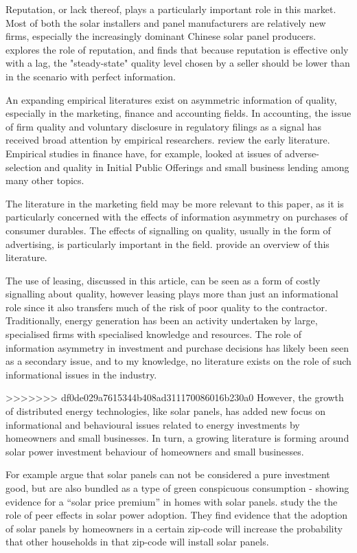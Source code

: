 \documentclass[12pt]{article}
\begin{document}
Reputation, or lack thereof, plays a particularly important role in this market. Most of both the solar installers and panel manufacturers are relatively new firms, especially the increasingly dominant Chinese solar panel producers. \citet{shapiro_consumer_1982} explores the role of reputation, and finds that because reputation is effective only with a lag, the "steady-state" quality level chosen by a seller should be lower than in the scenario with perfect information.

An expanding empirical literatures exist on asymmetric information of quality, especially in the marketing, finance and accounting fields. In accounting, the issue of firm quality and voluntary disclosure in regulatory filings as a signal has received broad attention by empirical researchers. \citet{healy_information_2001} review the early literature. Empirical studies in finance have, for example, looked at issues of adverse-selection and quality in Initial Public Offerings \citep{michaely_pricing_1994} and small business lending \citep{petersen_benefits_1994} among many other topics.

The literature in the marketing field may be more relevant to this paper, as it is particularly concerned with the effects of information asymmetry on purchases of consumer durables. The effects of signalling on quality, usually in the form of advertising, is particularly important in the field. \citet{kirmani_no_2000} provide an overview of this literature.

The use of leasing, discussed in this article, can be seen as a form of costly signalling about quality, however leasing plays more than just an informational role since it also transfers much of the risk of poor quality to the contractor. Traditionally, energy generation has been an activity undertaken by large, specialised firms with specialised knowledge and resources. The role of information asymmetry in investment and purchase decisions has likely been seen as a secondary issue, and to my knowledge, no literature exists on the role of such informational issues in the industry.

>>>>>>> df0de029a7615344b408ad311170086016b230a0
However, the growth of distributed energy technologies, like solar panels, has added new focus on informational and behavioural issues related to energy investments by homeowners and small businesses. In turn, a growing literature is forming around solar power investment behaviour of homeowners and small businesses.

For example \citet{dastrup_understanding_2012} argue that solar panels can not be considered a pure investment good, but are also bundled as a type of green conspicuous consumption - showing evidence for a ``solar price premium'' in homes with solar panels. \citet{bollinger_peer_2012} study the the role of peer effects in solar power adoption. They find evidence that the adoption of solar panels by homeowners in a certain zip-code will increase the probability that other households in that zip-code will install solar panels.
\end{document}
